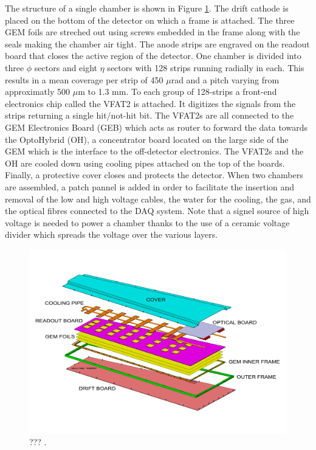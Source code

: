     The structure of a single chamber is shown in Figure \ref{fig:II-1-gem-exploded}. The drift cathode is placed on the bottom of the detector on which a frame is attached. The three GEM foils are streched out using screws embedded in the frame along with the seals making the chamber air tight. The anode strips are engraved on the readout board that closes the active region of the detector. One chamber is divided into three $ \phi $ sectors and eight $ \eta $ sectors with 128 strips running radially in each. This results in a mean coverage per strip of 450 $\mu$rad and a pitch varying from approximatly 500 $\mu$m to 1.3 mm. To each group of 128-strips a front-end electronics chip called the VFAT2 is attached. It digitizes the signals from the strips returning a single hit/not-hit bit. The VFAT2s are all connected to the GEM Electronics Board (GEB) which acts as router to forward the data towards the OptoHybrid (OH), a concentrator board located on the large side of the GEM which is the interface to the off-detector electronics. The VFAT2s and the OH are cooled down using cooling pipes attached on the top of the boards. Finally, a protective cover closes and protects the detector. When two chambers are assembled, a patch pannel is added in order to facilitate the insertion and removal of the low and high voltage cables, the water for the cooling, the gas, and the optical fibres connected to the DAQ system. Note that a signel source of high voltage is needed to power a chamber thanks to the use of a ceramic voltage divider which spreads the voltage over the various layers. \\

    \begin{figure}[h!]
      \centering
      \includegraphics[width=\textwidth]{img/II-1-gem/gem-exploded.pdf}
      \caption{??? \cite{Colaleo:2021453}.}
      \label{fig:II-1-gem-exploded}
    \end{figure}

